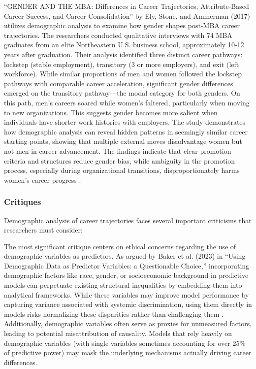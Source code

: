 \documentclass[../main.tex]{subfiles}
\begin{document}
``GENDER AND THE MBA: Differences in Career Trajectories, Attribute-Based Career Success, and Career Consolidation'' by Ely, Stone, and Ammerman (2017) utilizes demographic analysis to examine how gender shapes post-MBA career trajectories. The researchers conducted qualitative interviews with 74 MBA graduates from an elite Northeastern U.S. business school, approximately 10-12 years after graduation. Their analysis identified three distinct career pathways: lockstep (stable employment), transitory (3 or more employers), and exit (left workforce). While similar proportions of men and women followed the lockstep pathways with comparable career acceleration, significant gender differences emerged on the transitory pathway—the modal category for both genders. On this path, men's careers soared while women's faltered, particularly when moving to new organizations. This suggests gender becomes more salient when individuals have shorter work histories with employers. The study demonstrates how demographic analysis can reveal hidden patterns in seemingly similar career starting points, showing that multiple external moves disadvantage women but not men in career advancement. The findings indicate that clear promotion criteria and structures reduce gender bias, while ambiguity in the promotion process, especially during organizational transitions, disproportionately harms women's career progress \citep{ely2017gender}.

\subsubsection{Critiques}

Demographic analysis of career trajectories faces several important criticisms that researchers must consider:

The most significant critique centers on ethical concerns regarding the use of demographic variables as predictors. As argued by Baker et al. (2023) in ``Using Demographic Data as Predictor Variables: a Questionable Choice,'' incorporating demographic factors like race, gender, or socioeconomic background in predictive models can perpetuate existing structural inequalities by embedding them into analytical frameworks. While these variables may improve model performance by capturing variance associated with systemic discrimination, using them directly in models risks normalizing these disparities rather than challenging them \citep{baker2023demographic}. Additionally, demographic variables often serve as proxies for unmeasured factors, leading to potential misattribution of causality. Models that rely heavily on demographic variables (with single variables sometimes accounting for over 25\% of predictive power) may mask the underlying mechanisms actually driving career differences.
\end{document}
